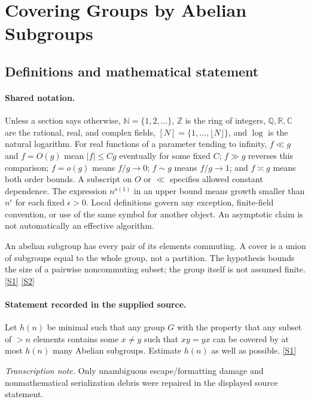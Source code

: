 \documentclass[11pt,a4paper]{article}
\newcommand{\N}{\mathbb{N}}
\newcommand{\Z}{\mathbb{Z}}
\newcommand{\Q}{\mathbb{Q}}
\newcommand{\R}{\mathbb{R}}
\newcommand{\C}{\mathbb{C}}
\newcommand{\sref}[2]{\hyperlink{source:#1:#2}{[S#2]}}
\begin{document}
\section{Covering Groups by Abelian Subgroups}\label{statement}


\subsection{Definitions and mathematical statement}

\paragraph{Shared notation.}Unless a section says otherwise, $\N=\{1,2,\ldots\}$,
$\Z$ is the ring of integers, $\Q,\R,\C$ are the rational, real, and complex
fields, $[N]=\{1,\ldots,\lfloor N\rfloor\}$, and $\log$ is the natural
logarithm. For real functions of a parameter tending to infinity,
$f\ll g$ and $f=O(g)$ mean $|f|\leq Cg$ eventually for some fixed $C$;
$f\gg g$ reverses this comparison; $f=o(g)$ means $f/g\to0$;
$f\sim g$ means $f/g\to1$; and $f\asymp g$ means both order bounds.
A subscript on $O$ or $\ll$ specifies allowed constant dependence.
The expression $n^{o(1)}$ in an upper bound means growth smaller than
$n^\epsilon$ for each fixed $\epsilon>0$. Local definitions govern any
exception, finite-field convention, or use of the same symbol for another
object. An asymptotic claim is not automatically an effective algorithm.



An abelian subgroup has every pair of its elements commuting. A cover is a union of subgroups equal to the whole group, not a partition. The hypothesis bounds the size of a pairwise noncommuting subset; the group itself is not assumed finite. \sref{statement}{1} \sref{statement}{2}

\paragraph{Statement recorded in the supplied source.}
Let $h(n)$ be minimal such that any group $G$ with the property that any subset of $>n$ elements contains some $x\neq y$ such that $xy=yx$ can be covered by at most $h(n)$ many Abelian subgroups.
Estimate $h(n)$ as well as possible. \sref{statement}{1}

{\small\emph{Transcription note.} Only unambiguous escape/formatting damage and nonmathematical serialization debris were repaired in the displayed source statement.}
\end{document}
